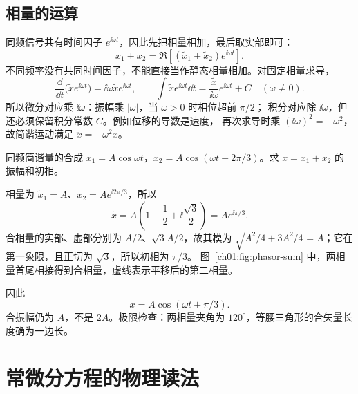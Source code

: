 \subsection{相量的运算}
同频信号共有时间因子 $e^{\ii\omega t}$，因此先把相量相加，最后取实部即可：
\[
 x_1+x_2=\Re\!\left[(\widetilde x_1+\widetilde x_2)e^{\ii\omega t}\right].
\]
不同频率没有共同时间因子，不能直接当作静态相量相加。对固定相量求导，
\[
 \frac{\dd}{\dd t}\bigl(\widetilde x e^{\ii\omega t}\bigr)
 =\ii\omega\widetilde x e^{\ii\omega t},\qquad
 \int\widetilde x e^{\ii\omega t}\dd t
 =\frac{\widetilde x}{\ii\omega}e^{\ii\omega t}+C\quad(\omega\ne0).
\]
所以微分对应乘 $\ii\omega$：振幅乘 $|\omega|$，当 $\omega>0$ 时相位超前 $\pi/2$；
积分对应除 $\ii\omega$，但还必须保留积分常数 $C$。例如位移的导数是速度，
再次求导时乘 $(\ii\omega)^2=-\omega^2$，故简谐运动满足 $\ddot x=-\omega^2x$。

\begin{origexamplebox}{同频简谐量的合成}
$x_1=A\cos\omega t$，$x_2=A\cos(\omega t+2\pi/3)$。求 $x=x_1+x_2$ 的振幅和初相。
\end{origexamplebox}
\begin{xesolution}
相量为 $\widetilde x_1=A$、$\widetilde x_2=Ae^{\ii2\pi/3}$，所以
\[
 \widetilde x=A\left(1-\frac12+\ii\frac{\sqrt3}{2}\right)
 =Ae^{\ii\pi/3}.
\]
合相量的实部、虚部分别为 $A/2$、$\sqrt3A/2$，故其模为
$\sqrt{A^2/4+3A^2/4}=A$；它在第一象限，且正切为 $\sqrt3$，所以初相为 $\pi/3$。
图~\ref{ch01:fig:phasor-sum} 中，两相量首尾相接得到合相量，虚线表示平移后的第二相量。
\begin{center}
\label{ch01:fig:phasor-sum}
\end{center}
因此
\[
 \boxed{x=A\cos(\omega t+\pi/3)}.
\]
合振幅仍为 $A$，不是 $2A$。极限检查：两相量夹角为 $120^\circ$，等腰三角形的合矢量长度确为一边长。
\end{xesolution}

\section{常微分方程的物理读法}

